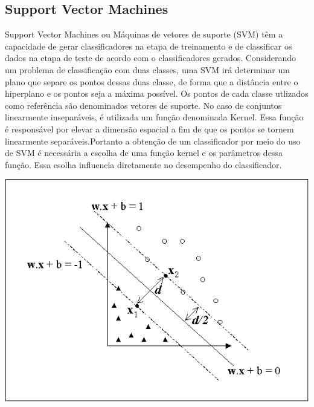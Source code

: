 \subsection{Support Vector Machines}
Support Vector Machines ou Máquinas de vetores de suporte (SVM) têm a capacidade de gerar classificadores na etapa de treinamento e de classificar os dados na etapa de teste de acordo com o classificadores gerados. Considerando um problema de classificação com duas classes, uma SVM irá determinar um plano que separe os pontos dessas duas classe, de forma que a distância entre o hiperplano e os pontos seja a máxima possível. Os pontos de cada classe utlizados como referência são denominados vetores de suporte.
No caso de conjuntos linearmente inseparáveis, é utilizada um função denominada Kernel. Essa função é responsável por elevar a dimensão espacial a fim de que os pontos se tornem linearmente separáveis.Portanto a obtenção de um classificador por meio do uso de SVM é necessária a escolha de uma função kernel e os parâmetros dessa função. Essa esolha influencia diretamente no desempenho do classificador\cite{Gunn98SVM}\cite{Reffson02SVM}.

\begin{center}
	\includegraphics[scale=0.5]{graficos/SVm1}
	\label{img:svm1}
\end{center}

